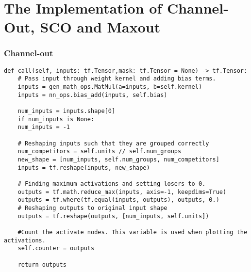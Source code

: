 \section{The Implementation of Channel-Out, \ac{SCO} and Maxout}\label{sec:TFImp}
\subsubsection*{Channel-out}
\lstset{style=Python}
\begin{lstlisting}[caption={Python implementation for the custom activation function used to define the channel-out layer.},captionpos=b, label={lst:channel_out}]
def call(self, inputs: tf.Tensor,mask: tf.Tensor = None) -> tf.Tensor:
    # Pass input through weight kernel and adding bias terms.
    inputs = gen_math_ops.MatMul(a=inputs, b=self.kernel)
    inputs = nn_ops.bias_add(inputs, self.bias)

    num_inputs = inputs.shape[0]
    if num_inputs is None:
    num_inputs = -1

    # Reshaping inputs such that they are grouped correctly
    num_competitors = self.units // self.num_groups
    new_shape = [num_inputs, self.num_groups, num_competitors]
    inputs = tf.reshape(inputs, new_shape)

    # Finding maximum activations and setting losers to 0.
    outputs = tf.math.reduce_max(inputs, axis=-1, keepdims=True)
    outputs = tf.where(tf.equal(inputs, outputs), outputs, 0.)
    # Reshaping outputs to original input shape
    outputs = tf.reshape(outputs, [num_inputs, self.units])

    #Count the activate nodes. This variable is used when plotting the activations.
    self.counter = outputs

    return outputs 
\end{lstlisting}
